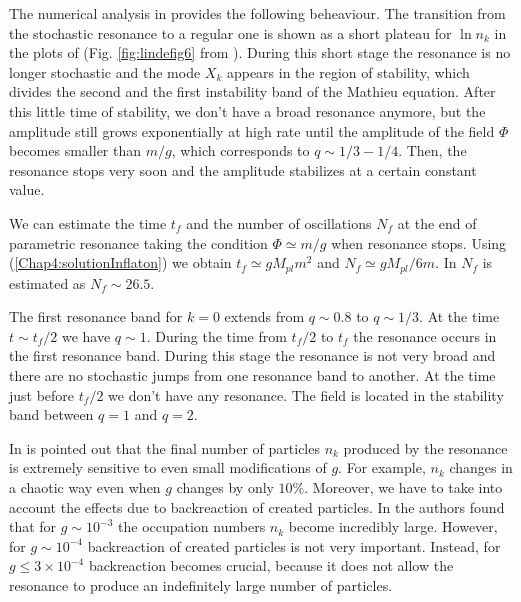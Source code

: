 \documentclass[11pt,a4paper,twoside]{book}
\begin{document}
 The numerical analysis in \cite{Chap4:LindePreheatingModel} provides the following beheaviour. The transition from the stochastic resonance to a regular one is shown as a short plateau for $ \ln n_{k} $ in the plots of \cite{Chap4:LindePreheatingModel} (Fig. \ref{fig:lindefig6} from \cite{Chap4:LindePreheatingModel}). During this short stage the resonance is no longer stochastic and the mode $ X_{k} $ appears in the region of stability, which divides the second and the first instability band of the Mathieu equation. After this little time of stability, we don't have a broad resonance anymore, but the amplitude still grows exponentially at high rate until the amplitude of the field $ \Phi $ becomes smaller than $ m/g $, which corresponds to $ q \sim 1/3-1/4 $. Then, the resonance stops very soon and the amplitude stabilizes at a certain constant value.
 
We can estimate the time $ t_{f} $ and the number of oscillations $ N_{f} $ at the end of parametric resonance taking the condition $\Phi \simeq m/g$ when resonance stops. Using (\ref{Chap4:solutionInflaton}) we obtain $ t_{f}\simeq gM_{pl}m^{2}$ and $ N_{f}\simeq gM_{pl}/6m $. In \cite{Chap4:LindePreheatingModel} $ N_{f} $ is estimated as $ N_{f} \sim 26.5 $.

The first resonance band for $ k=0 $ extends from $ q\sim 0.8 $ to $ q\sim 1/3 $. At the time $ t\sim t_{f}/2 $ we have $ q \sim 1 $. During the time from $ t_{f}/2 $ to $ t_{f} $ the resonance occurs in the first resonance band. During this stage the resonance is not very broad and there are no stochastic jumps from one resonance band to another. At the time just before $ t_{f}/2 $ we don't have any resonance. The field is located in the stability band between $ q=1 $ and $ q=2 $.

 In \cite{Chap4:LindePreheatingModel} is pointed out that the final number of particles $ n_{k} $ produced by the resonance is extremely sensitive to even small modifications of $ g $. For example, $ n_{k} $ changes in a chaotic way even when $ g $ changes by only $ 10\% $. Moreover, we have to take into account the effects due to backreaction of created particles. In \cite{Chap4:LindePreheatingModel} the authors found that for $ g \sim 10^{-3} $ the occupation numbers $ n_{k} $ become incredibly large. However, for $ g \sim 10^{-4} $ backreaction of created particles is not very important. Instead, for $ g \le 3 \times 10^{-4} $ backreaction becomes crucial, because it does not allow the resonance to produce an indefinitely large number of particles.
 
\end{document}
